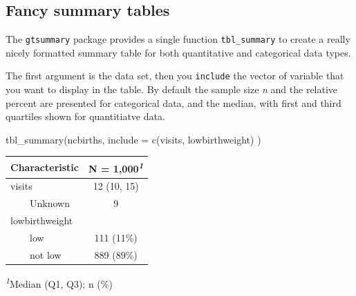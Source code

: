 \documentclass[
  letterpaper,
  DIV=11,
  numbers=noendperiod,
  oneside]{scrreprt}
\newenvironment{Shaded}{\begin{snugshade}}{\end{snugshade}}
\newcommand{\AttributeTok}[1]{\textcolor[rgb]{0.40,0.45,0.13}{#1}}
\newcommand{\CommentTok}[1]{\textcolor[rgb]{0.37,0.37,0.37}{#1}}
\newcommand{\FunctionTok}[1]{\textcolor[rgb]{0.28,0.35,0.67}{#1}}
\newcommand{\NormalTok}[1]{\textcolor[rgb]{0.00,0.23,0.31}{#1}}
\newcommand{\SpecialCharTok}[1]{\textcolor[rgb]{0.37,0.37,0.37}{#1}}
\begin{document}
\begin{Shaded}
\end{Shaded}

\subsection{Fancy summary tables}\label{sec-intro-tbl_summary}

The \texttt{gtsummary} package provides a single function
\texttt{tbl\_summary} to create a really nicely formatted summary table
for both quantitative and categorical data types.

The first argument is the data set, then you \texttt{include} the vector
of variable that you want to display in the table. By default the sample
size \emph{n} and the relative percent are presented for categorical
data, and the median, with first and third quartiles shown for
quantitiatve data.

\begin{Shaded}
\begin{Highlighting}[]
\FunctionTok{tbl\_summary}\NormalTok{(ncbirths, }
            \AttributeTok{include =} \FunctionTok{c}\NormalTok{(visits, lowbirthweight)}
\NormalTok{            )}
\end{Highlighting}
\end{Shaded}

\begin{table}
\fontsize{12.0pt}{14.4pt}\selectfont
\begin{tabular*}{\linewidth}{@{\extracolsep{\fill}}lc}
\toprule
\textbf{Characteristic} & \textbf{N = 1,000}\textsuperscript{\textit{1}} \\ 
\midrule\addlinespace[2.5pt]
visits & 12 (10, 15) \\ 
    Unknown & 9 \\ 
lowbirthweight &  \\ 
    low & 111 (11\%) \\ 
    not low & 889 (89\%) \\ 
\bottomrule
\end{tabular*}
\begin{minipage}{\linewidth}
\textsuperscript{\textit{1}}Median (Q1, Q3); n (\%)\\
\end{minipage}
\end{table}
\end{document}

